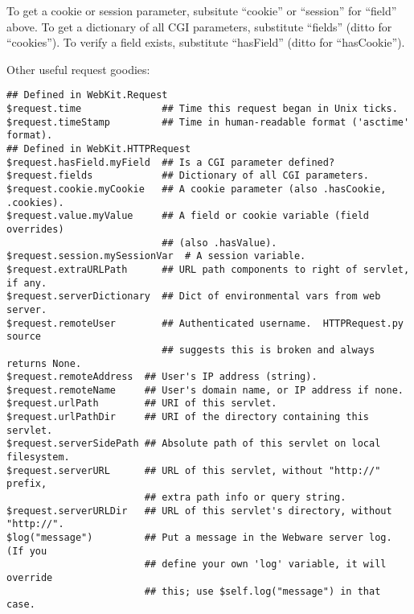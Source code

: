 To get a cookie or session parameter, subsitute ``cookie'' or ``session'' for
``field'' above.  To get a dictionary of all CGI parameters, substitute
``fields'' (ditto for ``cookies'').  To verify a field exists,
substitute ``hasField'' (ditto for ``hasCookie'').  

Other useful request goodies:
\begin{verbatim}
## Defined in WebKit.Request
$request.time              ## Time this request began in Unix ticks.
$request.timeStamp         ## Time in human-readable format ('asctime' format).
## Defined in WebKit.HTTPRequest
$request.hasField.myField  ## Is a CGI parameter defined?
$request.fields            ## Dictionary of all CGI parameters.
$request.cookie.myCookie   ## A cookie parameter (also .hasCookie, .cookies).
$request.value.myValue     ## A field or cookie variable (field overrides)
                           ## (also .hasValue).
$request.session.mySessionVar  # A session variable.
$request.extraURLPath      ## URL path components to right of servlet, if any.
$request.serverDictionary  ## Dict of environmental vars from web server.
$request.remoteUser        ## Authenticated username.  HTTPRequest.py source
                           ## suggests this is broken and always returns None.
$request.remoteAddress  ## User's IP address (string).
$request.remoteName     ## User's domain name, or IP address if none.
$request.urlPath        ## URI of this servlet.
$request.urlPathDir     ## URI of the directory containing this servlet.
$request.serverSidePath ## Absolute path of this servlet on local filesystem.
$request.serverURL      ## URL of this servlet, without "http://" prefix,
                        ## extra path info or query string.
$request.serverURLDir   ## URL of this servlet's directory, without "http://".
$log("message")         ## Put a message in the Webware server log.  (If you
                        ## define your own 'log' variable, it will override
                        ## this; use $self.log("message") in that case.
\end{verbatim}




